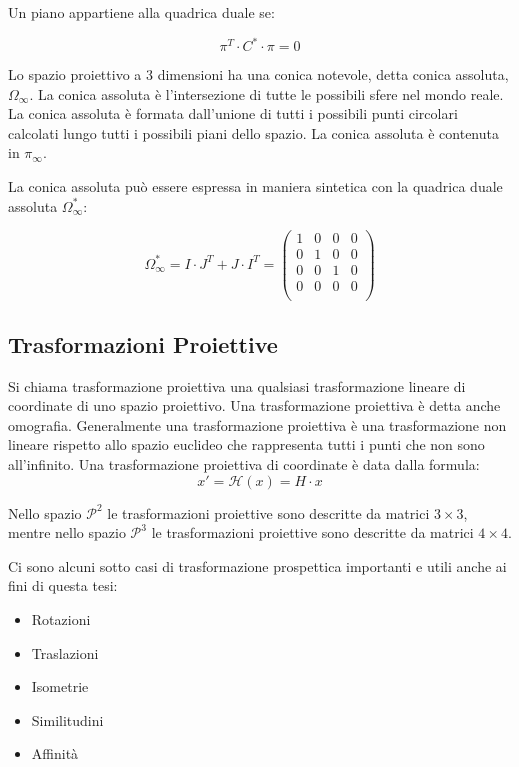 Un piano appartiene alla quadrica duale se:

\begin{equation*}
 \pi^T\cdot C^* \cdot \pi = 0
\end{equation*}

Lo spazio proiettivo a 3 dimensioni ha una conica notevole, detta conica assoluta, $\Omega_\infty$. La conica assoluta è l'intersezione di tutte le possibili sfere nel mondo reale. La conica assoluta è formata dall'unione di tutti i possibili punti circolari calcolati lungo tutti i possibili piani dello spazio.
La conica assoluta è contenuta in $\pi_\infty$.

La conica assoluta può essere espressa in maniera sintetica con la quadrica duale assoluta $\Omega^*_\infty$:

\begin{equation*}
 \Omega^*_\infty = I\cdot J^T + J\cdot I^T =\begin{pmatrix} 1 & 0 & 0 & 0 \\ 0 & 1 & 0 & 0 \\ 0 & 0 & 1 & 0 \\ 0 & 0 & 0 & 0 \\ \end{pmatrix}
\end{equation*}

\subsection{Trasformazioni Proiettive}

Si chiama trasformazione proiettiva una qualsiasi trasformazione lineare di coordinate di uno spazio proiettivo. Una trasformazione proiettiva è detta anche omografia.
Generalmente una trasformazione proiettiva è una trasformazione non lineare rispetto allo spazio euclideo che rappresenta tutti i punti che non sono all'infinito.
Una trasformazione proiettiva di coordinate è data dalla formula:
\begin{equation*}
 x' = \mathcal{H}(x) = H\cdot x
\end{equation*}

Nello spazio $\mathcal{P}^2$ le trasformazioni proiettive sono descritte da matrici $3\times3$, mentre nello spazio $\mathcal{P}^3$ le trasformazioni proiettive sono descritte da matrici $4\times4$.

Ci sono alcuni sotto casi di trasformazione prospettica importanti e utili anche ai fini di questa tesi:

\begin{itemize}
 \item Rotazioni
 \item Traslazioni
 \item Isometrie
 \item Similitudini
 \item Affinità
\end{itemize}

